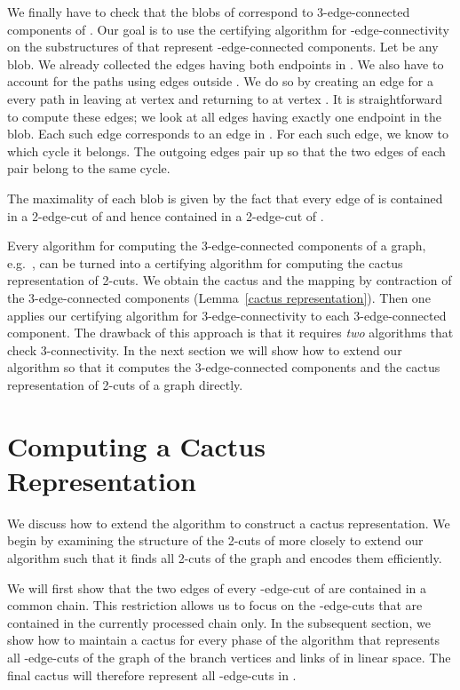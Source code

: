 \documentclass[paper=a4]{scrartcl}
\begin{document}
We finally have to check that the blobs of  correspond to 3-edge-connected components of . Our goal is to use the certifying algorithm for -edge-connectivity on the substructures of  that represent -edge-connected components. Let  be any blob. We already collected the edges having both endpoints in . We also have to account for the paths using edges outside .  We do so by creating an edge  for a every path in  leaving  at vertex  and returning to  at vertex . 
It is straightforward to compute these edges; we look at all edges having exactly one endpoint in the blob. Each such edge corresponds to an edge in . For each such edge, we know to which cycle it belongs. The outgoing edges pair up so that the two edges of each pair belong to the same cycle. 

The maximality of each blob  is given by the fact that every edge of  is contained in a 2-edge-cut of  and hence contained in a 2-edge-cut of .

Every algorithm for computing the 3-edge-connected components of a graph, e.g.~\cite{Nagamochi1992a,Taoka1992,Tsin2007,Tsin2009,Nagamochi-Ibaraki-Book}, can be turned into a certifying algorithm for computing the cactus representation of 2-cuts. We obtain the cactus  and the mapping  by contraction of the 3-edge-connected components (Lemma~\ref{cactus representation}). Then one applies our certifying algorithm for 3-edge-connectivity to each 3-edge-connected component. The drawback of this approach is that it requires  \emph{two} algorithms that check 3-connectivity. 
In the next section we will show how to extend our algorithm so that it computes the 3-edge-connected components and the cactus representation of 2-cuts of a graph directly.


\section{Computing a Cactus Representation}\label{Computing a Cactus}

We discuss how to extend the algorithm to construct a cactus representation. We begin by examining the structure of the 2-cuts of  more closely to extend our algorithm such that it finds all 2-cuts of the graph and encodes them efficiently.

We will first show that the two edges of every -edge-cut of  are contained in a common chain. This restriction allows us to focus on the -edge-cuts that are contained in the currently processed chain  only. In the subsequent section, we show how to maintain a cactus for every phase  of the algorithm that represents all -edge-cuts of the graph of the branch vertices and links of  in linear space. The final cactus will therefore represent all -edge-cuts in .
\end{document}
